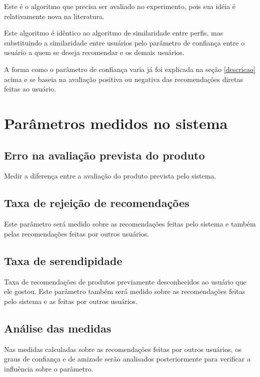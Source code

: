 \documentclass[a4paper,12pt]{article}
\begin{document}
Este é o algoritmo que precisa ser avaliado no experimento, pois sua idéia é relativamente nova na literatura.

Este algoritmo é idêntico ao algoritmo de similaridade entre perfis, mas substituindo a similaridade entre usuários pelo parâmetro de confiança entre o usuário a quem se deseja recomendar e os demais usuários.

A forma como o parâmetro de confiança varia já foi explicada na seção \ref{descricao} acima e se baseia na avaliação positiva ou negativa das recomendações diretas feitas ao usuário.

\section{Parâmetros medidos no sistema}

\subsection{Erro na avaliação prevista do produto}

Medir a diferença entre a avaliação do produto prevista pelo sistema.

\subsection{Taxa de rejeição de recomendações}

Este parâmetro será  medido sobre as recomendações feitas pelo sistema e também pelas recomendações feitas por outros usuários.

\subsection{Taxa de serendipidade}

Taxa de recomendações de produtos previamente desconhecidos ao usuário que ele gostou. Este parâmetro também será medido sobre as recomendações feitas pelo sistema e as feitas por outros usuários.

\subsection{Análise das medidas}

Nas medidas calculadas sobre as recomendações feitas por outros usuários, os graus de confiança e de amizade serão analisados posteriormente para verificar a influência sobre o parâmetro.
\end{document}

